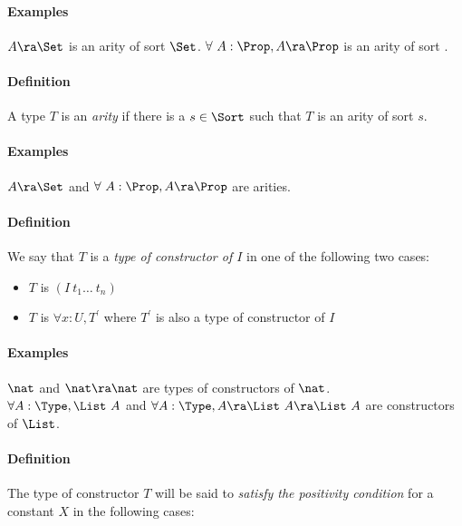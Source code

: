 \paragraph[Examples]{Examples}
$A\ra \Set$ is an arity of sort $\Set$.
$\forall~A:\Prop,A\ra \Prop$ is an arity of sort \Prop.

\paragraph[Definition]{Definition}
A type $T$ is an {\em arity} if there is a $s\in\Sort$
such that $T$ is an arity of sort $s$.

\paragraph[Examples]{Examples}
$A\ra \Set$ and $\forall~A:\Prop,A\ra \Prop$ are arities.

\paragraph[Definition]{Definition}
We say that $T$ is a {\em type of constructor of $I$}
in one of the following two cases:
\begin{itemize}
  \item $T$ is $(I~t_1\ldots ~t_n)$
  \item $T$ is $\forall x:U,T^\prime$ where $T^\prime$ is also a type of constructor of $I$
\end{itemize}

\paragraph[Examples]{Examples}
$\nat$ and $\nat\ra\nat$ are types of constructors of $\nat$.\\
$\forall A:\Type,\List~A$ and $\forall A:\Type,A\ra\List~A\ra\List~A$ are constructors of $\List$.

\paragraph[Definition]{Definition\label{Positivity}}
The type of constructor $T$ will be said to {\em satisfy the positivity
condition} for a constant $X$ in the following cases:

